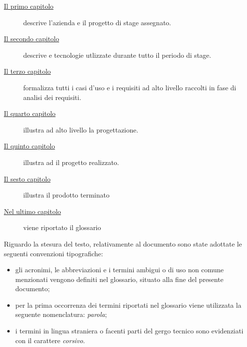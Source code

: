 \begin{description}
	\item[{\hyperref[cap:introduzione]{Il primo capitolo}}] descrive l’azienda e il progetto di stage assegnato.
	
	\item[{\hyperref[cap:Tecnologie utilizzate]{Il secondo capitolo}}] descrive e tecnologie utlizzate durante
	tutto il periodo di stage.
	
	\item[{\hyperref[cap:analisi-requisiti]{Il terzo capitolo}}] formalizza tutti i casi d’uso e i requisiti ad alto livello raccolti in fase di
	analisi dei requisiti.
	
	\item[{\hyperref[cap:progettazione]{Il quarto capitolo}}] illustra ad alto livello la progettazione.
	
		\item[{\hyperref[cap:progetto-terminato]{Il quinto capitolo}}] illustra ad il progetto realizzato.
	
	\item[{\hyperref[cap:conclusioni]{Il sesto capitolo}}] illustra il prodotto terminato
	
	\item[{\hyperref[cap:conclusioni]{Nel ultimo capitolo}}] viene riportato il glossario
\end{description}
Riguardo la stesura del testo, relativamente al documento sono state adottate le seguenti convenzioni tipografiche:
\begin{itemize}
	\item gli acronimi, le abbreviazioni e i termini ambigui o di uso non comune menzionati vengono definiti nel glossario, situato alla fine del presente documento;
	\item per la prima occorrenza dei termini riportati nel glossario viene utilizzata la seguente nomenclatura: \emph{parola}\glsfirstoccur;
	\item i termini in lingua straniera o facenti parti del gergo tecnico sono evidenziati con il carattere \emph{corsivo}.
\end{itemize}
\endgroup			

\vfill

